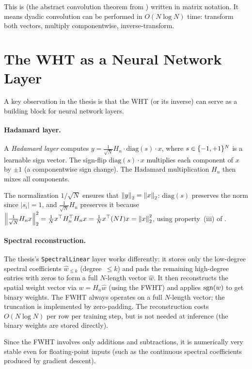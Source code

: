 This is  (the abstract convolution theorem from
) written in matrix notation.
It means dyadic convolution can be performed in $O(N \log N)$ time:
transform both vectors, multiply componentwise, inverse-transform.


\section{The WHT as a Neural Network Layer}\label{sec:wht-layer}

A key observation in the thesis is that the WHT (or its inverse) can
serve as a building block for neural network layers.

\paragraph{Hadamard layer.}
A \emph{Hadamard layer} computes $y = \frac{1}{\sqrt{N}} H_n \cdot \text{diag}(s) \cdot x$,
where $s \in \{-1,+1\}^N$ is a learnable sign vector. The sign-flip
$\text{diag}(s) \cdot x$ multiplies each component of $x$ by $\pm 1$
(a componentwise sign change). The Hadamard multiplication $H_n$ then
mixes all components.

The normalization $1/\sqrt{N}$ ensures that $\left\| y \right\|_2 = \left\| x \right\|_2$:
$\text{diag}(s)$ preserves the norm since $|s_i| = 1$, and
$\frac{1}{\sqrt{N}} H_n$ preserves it because
$\left\| \frac{1}{\sqrt{N}} H_n x \right\|_2^2
= \frac{1}{N} x^\top H_n^\top H_n x
= \frac{1}{N} x^\top (N I) x = \left\| x \right\|_2^2$,
using property~(iii) of .

\paragraph{Spectral reconstruction.}
The thesis's \texttt{SpectralLinear} layer works differently: it stores
only the low-degree spectral coefficients $\hat{w}_{\leq k}$
(degree~$\leq k$) and pads the remaining high-degree entries with zeros
to form a full $N$-length vector $\hat{w}$. It then reconstructs the
spatial weight vector via $w = H_n \hat{w}$ (using the FWHT) and
applies $\operatorname{sgn}(w)$ to get binary weights. The FWHT always operates on
a full $N$-length vector; the truncation is implemented by zero-padding.
The reconstruction costs $O(N \log N)$ per row per training step, but is
not needed at inference (the binary weights are stored directly).

Since the FWHT involves only additions and subtractions, it is
numerically very stable even for floating-point inputs (such as the
continuous spectral coefficients produced by gradient descent).


